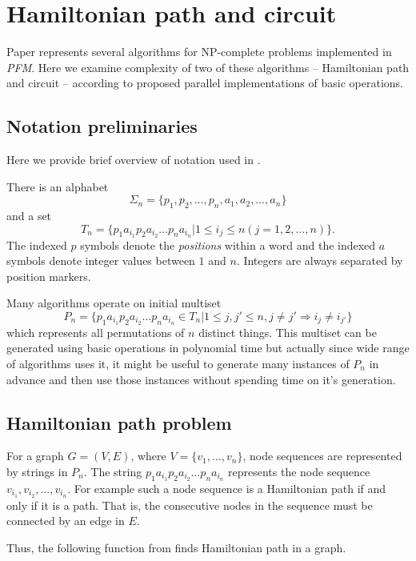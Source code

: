 \section{Hamiltonian path and circuit} \label{algo}

Paper \cite{Katsanyi:2003} represents several algorithms for NP-complete problems implemented in \emph{PFM}. Here we examine complexity of two of these algorithms -- Hamiltonian path and circuit -- according to proposed parallel implementations of basic operations.

\subsection{Notation preliminaries}
Here we provide brief overview of notation used in \cite{Katsanyi:2003}. 

There is an alphabet
$$\Sigma_n = \{p_1, p_2, \dots, p_n, a_1, a_2, \dots, a_n\}$$
and a set
$$T_n = \{p_1 a_{i_1} p_2 a_{i_2} \dots p_n a_{i_n} |
1 \leq i_j \leq n (j = 1, 2, \dots, n)\}.$$
The indexed $p$ symbols denote the \emph{positions} within a word and the indexed $a$ symbols denote integer values between $1$ and $n$. Integers are always separated by position markers.

Many algorithms operate on initial multiset 
$$P_n=\{p_1 a_{i_1} p_2 a_{i_2} \dots p_n a_{i_n} \in T_n | 
         1 \leq j, j' \leq n, j \neq j' \Rightarrow i_j \neq i_{j'}\}$$ 
which represents all permutations of $n$ distinct things. This multiset can be generated using basic operations in polynomial time \cite{Amos:1996} but actually since wide range of algorithms uses it, it might be useful to generate many instances of $P_n$ in advance and then use those instances without spending time on it's generation.

\subsection{Hamiltonian path problem}
For a graph $G=(V, E)$, where $V=\{v_1, \dots, v_n\}$, node sequences are represented by strings in $P_n$. The string $p_1 a_{i_1} p_2 a_{i_2} \dots p_n a_{i_n}$ represents the node sequence $v_{i_1}, v_{i_2}, \dots, v_{i_n}$. For example such a node sequence is a Hamiltonian path if and only if it is a path. That is, the consecutive nodes in the sequence must be connected by an edge in $E$.

Thus, the following function from \cite{Amos:1996} finds Hamiltonian path in a graph.

